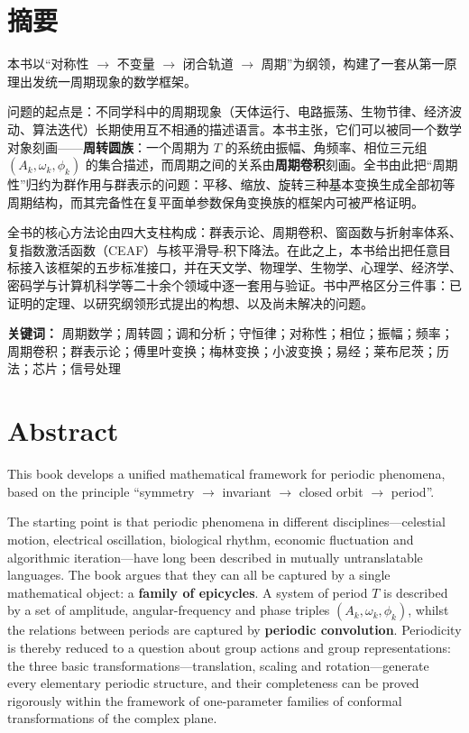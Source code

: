 \chapter*{摘要}

本书以“对称性 $\to$ 不变量 $\to$ 闭合轨道 $\to$ 周期”为纲领，构建了一套从第一原理出发统一周期现象的数学框架。

问题的起点是：不同学科中的周期现象（天体运行、电路振荡、生物节律、经济波动、算法迭代）长期使用互不相通的描述语言。本书主张，它们可以被同一个数学对象刻画——\textbf{周转圆族}：一个周期为 $T$ 的系统由振幅、角频率、相位三元组 $(A_k,\omega_k,\phi_k)$ 的集合描述，而周期之间的关系由\textbf{周期卷积}刻画。全书由此把“周期性”归约为群作用与群表示的问题：平移、缩放、旋转三种基本变换生成全部初等周期结构，而其完备性在复平面单参数保角变换族的框架内可被严格证明。

全书的核心方法论由四大支柱构成：群表示论、周期卷积、窗函数与折射率体系、复指数激活函数（CEAF）与核平滑导-积下降法。在此之上，本书给出把任意目标接入该框架的五步标准接口，并在天文学、物理学、生物学、心理学、经济学、密码学与计算机科学等二十余个领域中逐一套用与验证。书中严格区分三件事：已证明的定理、以研究纲领形式提出的构想、以及尚未解决的问题。

\vspace{1em}
\noindent\textbf{关键词：} 周期数学；周转圆；调和分析；守恒律；对称性；相位；振幅；频率；周期卷积；群表示论；傅里叶变换；梅林变换；小波变换；易经；莱布尼茨；历法；芯片；信号处理

\chapter*{Abstract}

This book develops a unified mathematical framework for periodic phenomena, based on the principle ``symmetry $\to$ invariant $\to$ closed orbit $\to$ period''.

The starting point is that periodic phenomena in different disciplines---celestial motion, electrical oscillation, biological rhythm, economic fluctuation and algorithmic iteration---have long been described in mutually untranslatable languages. The book argues that they can all be captured by a single mathematical object: a \textbf{family of epicycles}. A system of period $T$ is described by a set of amplitude, angular-frequency and phase triples $(A_k,\omega_k,\phi_k)$, whilst the relations between periods are captured by \textbf{periodic convolution}. Periodicity is thereby reduced to a question about group actions and group representations: the three basic transformations---translation, scaling and rotation---generate every elementary periodic structure, and their completeness can be proved rigorously within the framework of one-parameter families of conformal transformations of the complex plane.

